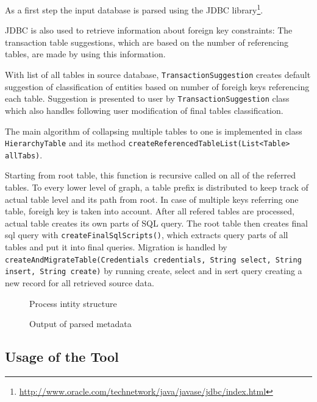 As a first step the input database is parsed using the JDBC library\footnote{\url{http://www.oracle.com/technetwork/java/javase/jdbc/index.html}}.

JDBC is also used to retrieve information about foreign key constraints: The transaction table suggestions, which are based on the number of referencing tables, are made by using this information.

With list of all tables in source database, \texttt{TransactionSuggestion} creates default suggestion of classification of entities based on number of foreigh keys referencing each table.
Suggestion is presented to user by \texttt{TransactionSuggestion} class which also handles following user modification of final tables classification.

The main algorithm of collapsing multiple tables to one is implemented in class \texttt{HierarchyTable} and its method \texttt{createReferencedTableList(List<Table> allTabs)}.

Starting from root table, this function is recursive called on all of the referred tables. To every lower level of graph, a table prefix is distributed to keep track of actual table level and its path from root.
In case of multiple keys referring one table, foreigh key is taken into account. After all refered tables are processed, actual table creates its own parts of SQL query.
The root table then creates final sql query with \texttt{createFinalSqlScripts()}, which extracts query parts of all tables and put it into final queries.
Migration is handled by \texttt{createAndMigrateTable(Credentials credentials, String select, String insert, String create)} by running create, select and in sert query creating a new record for all retrieved source data.

\begin{figure}[p]
  
  \caption{Process intity structure}
  \label{fig:metadataOutput}
\end{figure}

\begin{figure}[p]
  
  \caption{Output of parsed metadata}
  \label{fig:metadataOutput}
\end{figure}

\subsection{Usage of the Tool}

